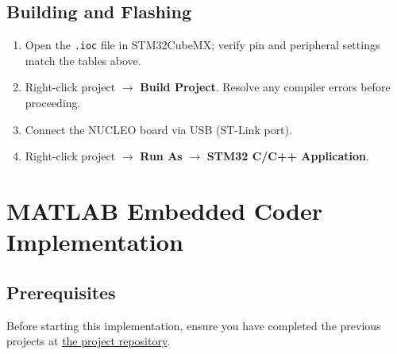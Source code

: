 \subsection{Building and Flashing}

\begin{enumerate}
    \item Open the \texttt{.ioc} file in STM32CubeMX; verify pin and
          peripheral settings match the tables above.
    \item Right-click project $\rightarrow$ \textbf{Build Project}.
          Resolve any compiler errors before proceeding.
    \item Connect the NUCLEO board via USB (ST-Link port).
    \item Right-click project $\rightarrow$ \textbf{Run As}
          $\rightarrow$ \textbf{STM32 C/C++ Application}.
\end{enumerate}


\section{MATLAB Embedded Coder Implementation}

\subsection{Prerequisites}

Before starting this implementation, ensure you have completed
the previous projects at
\href{https://github.com/Anmol-G-K/NUCLEO-G474RE-PowerElectronics-Guide/tree/main/Examples}{the project repository}.


